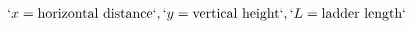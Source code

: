 \documentclass[preview]{standalone}
\begin{document}
\begin{align*}
`x = \text{horizontal distance}`, `y = \text{vertical height}`, `L = \text{ladder length}`
\end{align*}
\end{document}
